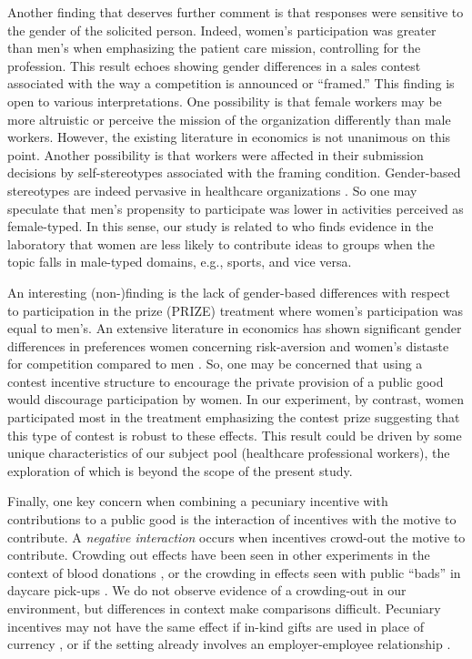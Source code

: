 \documentclass[11pt, titlepage]{article}
\begin{document}
Another finding that deserves further comment is that responses were
sensitive to the gender of the solicited person. Indeed, women's
participation was greater than men's when emphasizing the patient care
mission, controlling for the profession. This result echoes
\citet{delfgaauw2013tournament} showing gender differences in a sales
contest associated with the way a competition is announced or
``framed.'' This finding is open to various interpretations. One
possibility is that female workers may be more altruistic or perceive
the mission of the organization differently than male workers. However,
the existing literature in economics \citep{croson2009gender} is not
unanimous on this point. Another possibility is that workers were
affected in their submission decisions by self-stereotypes associated
with the framing condition. Gender-based stereotypes are indeed
pervasive in healthcare organizations \citep{evans2002cautious}. So one
may speculate that men's propensity to participate was lower in
activities perceived as female-typed. In this sense, our study is
related to \citet{coffman2014evidence} who finds evidence in the
laboratory that women are less likely to contribute ideas to groups when
the topic falls in male-typed domains, e.g., sports, and vice versa.

An interesting (non-)finding is the lack of gender-based differences
with respect to participation in the prize (PRIZE) treatment where
women's participation was equal to men's. An extensive literature in
economics has shown significant gender differences in preferences women
concerning risk-aversion \citep{borghans2009gender} and women's distaste
for competition compared to men \citep{niederle2007women}. So, one may
be concerned that using a contest incentive structure to encourage the
private provision of a public good would discourage participation by
women. In our experiment, by contrast, women participated most in the
treatment emphasizing the contest prize suggesting that this type of
contest is robust to these effects. This result could be driven by some
unique characteristics of our subject pool (healthcare professional
workers), the exploration of which is beyond the scope of the present
study.

Finally, one key concern when combining a pecuniary incentive with
contributions to a public good is the interaction of incentives with the
motive to contribute. A \emph{negative interaction} occurs when
incentives crowd-out the motive to contribute. Crowding out effects have
been seen in other experiments in the context of blood donations
\citep{lacetera2013economic, lacetera2014rewarding}, or the crowding in
effects seen with public ``bads'' in daycare pick-ups
\citep{gneezy2000fine}. We do not observe evidence of a crowding-out in
our environment, but differences in context make comparisons difficult.
Pecuniary incentives may not have the same effect if in-kind gifts are
used in place of currency \citep[e.g.,][]{kube2012currency}, or if the
setting already involves an employer-employee relationship
\citep[e.g.,][]{fehr1998gift}.
\end{document}
